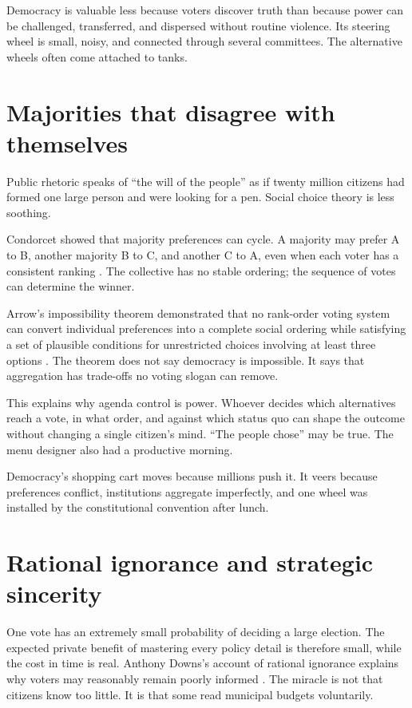 \documentclass[12pt,a4paper]{book}
\begin{document}
Democracy is valuable less because voters discover truth than because power can
be challenged, transferred, and dispersed without routine violence.  Its
steering wheel is small, noisy, and connected through several committees.  The
alternative wheels often come attached to tanks.

\section{Majorities that disagree with themselves}

Public rhetoric speaks of ``the will of the people'' as if twenty million
citizens had formed one large person and were looking for a pen.  Social choice
theory is less soothing.

Condorcet showed that majority preferences can cycle.  A majority may prefer
A to B, another majority B to C, and another C to A, even when each voter has a
consistent ranking \cite{Condorcet1785}.  The collective has no stable ordering;
the sequence of votes can determine the winner.

Arrow's impossibility theorem demonstrated that no rank-order voting system
can convert individual preferences into a complete social ordering while
satisfying a set of plausible conditions for unrestricted choices involving
at least three options \cite{Arrow1963}.  The theorem does not say democracy
is impossible.  It says that aggregation has trade-offs no voting slogan can
remove.

This explains why agenda control is power.  Whoever decides which alternatives
reach a vote, in what order, and against which status quo can shape the outcome
without changing a single citizen's mind.  ``The people chose'' may be true.
The menu designer also had a productive morning.

Democracy's shopping cart moves because millions push it.  It veers because
preferences conflict, institutions aggregate imperfectly, and one wheel was
installed by the constitutional convention after lunch.

\section{Rational ignorance and strategic sincerity}

One vote has an extremely small probability of deciding a large election.  The
expected private benefit of mastering every policy detail is therefore small,
while the cost in time is real.  Anthony Downs's account of rational ignorance
explains why voters may reasonably remain poorly informed
\cite{Downs1957}.  The miracle is not that citizens know too little.  It is that
some read municipal budgets voluntarily.
\end{document}
